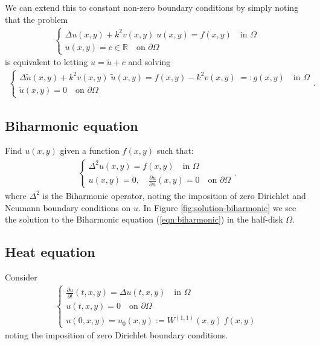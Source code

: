 \documentclass[11pt, oneside]{article}   	%
\newcommand{\sotodoinline}{\todo[color=green,inline=true]}
\newcommand{\R}{\mathbb{R}}
\newcommand{\Wii}{W^{(1,1)}}
\begin{document}
We can extend this to constant non-zero boundary conditions by simply noting that the problem 
\begin{align*}
	\begin{cases}
    		\Delta u(x,y) + k^2 v(x,y) \; u(x,y) = f(x,y) \quad \text{in } \Omega \\
		u(x,y) = c \in \R \quad \text{on } \partial \Omega
	\end{cases}
\end{align*}
is equivalent to letting $u = \tilde{u} + c$ and solving
\begin{align*}
	\begin{cases}
    		\Delta \tilde{u}(x,y) + k^2 v(x,y) \; \tilde{u}(x,y) = f(x,y) - k^2 v(x,y) \; =: g(x,y)  \quad \text{in } \Omega \\
		\tilde{u}(x,y) = 0 \quad \text{on } \partial \Omega
	\end{cases}.
\end{align*}


\subsection{Biharmonic equation}

Find \(u(x,y)\) given a function \(f(x,y)\) such that:
\begin{align}
	\begin{cases}
    		\Delta^2 u(x,y) = f(x,y) \quad \text{in } \Omega \\
		u(x,y) = 0, \quad \frac{\partial u}{\partial n}(x,y) = 0 \quad \text{on } \partial \Omega
	\end{cases}.
	\label{eqn:biharmonic}
\end{align}
where $\Delta^2$ is the Biharmonic operator, noting the imposition of zero Dirichlet and Neumann boundary conditions on $u$. In Figure \ref{fig:solution-biharmonic} we see the solution to the Biharmonic equation (\ref{eqn:biharmonic}) in the half-disk $\Omega$.


\subsection{Heat equation}

\sotodoinline{Skip example?}
Consider
\begin{align*}
	\begin{cases}
		\frac{\partial u}{\partial t}(t,x,y) = \Delta u(t,x,y) \quad \text{in } \Omega \\
		u(t, x, y) = 0 \quad \text{on } \partial \Omega \\
		u(0, x, y) = u_0(x,y) := \Wii(x,y) \: f(x,y)
	\end{cases}
\end{align*}
noting the imposition of zero Dirichlet boundary conditions.
\end{document}
